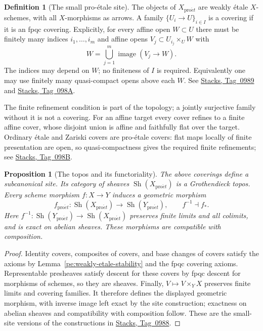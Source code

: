 \documentclass[11pt,a4paper]{article}
\numberwithin{equation}{section}
\newtheorem{proposition}[theorem]{Proposition}
\theoremstyle{definition}
\newtheorem{definition}[theorem]{Definition}
\theoremstyle{remark}
\newcommand{\Sh}{\operatorname{Sh}}
\newcommand{\proet}{\mathrm{pro}\acute{e}t}
\newcommand{\stacks}[1]{\href{https://stacks.math.columbia.edu/tag/#1}{\textnormal{Stacks, Tag~#1}}}
\begin{document}
\begin{definition}[The small pro-\'etale site]
\label{pe:site}
The objects of $X_{\proet}$ are weakly \'etale $X$-schemes, with all
$X$-morphisms as arrows. A family $\{U_i\to U\}_{i\in I}$ is a
covering if it is an fpqc covering. Explicitly, for every affine open
$W\subset U$ there must be finitely many indices
$i_1,\ldots,i_m$ and affine opens
$V_j\subset U_{i_j}\times_UW$ with
\[
 W=\bigcup_{j=1}^m\operatorname{image}(V_j\to W).
\]
The indices may depend on $W$; no finiteness of $I$ is required.
Equivalently one may use finitely many quasi-compact opens above each
$W$. See \stacks{0989} and \stacks{098A}.
\end{definition}

The finite refinement condition is part of the topology; a jointly
surjective family without it is not a covering. For an affine
target every cover refines to a finite affine cover, whose disjoint
union is affine and faithfully flat over the target. Ordinary \'etale
and Zariski covers are pro-\'etale covers: flat maps locally of finite
presentation are open, so quasi-compactness gives the required finite
refinements; see \stacks{098B}.

\begin{proposition}[The topos and its functoriality]
\label{pe:topos-functoriality}
The above coverings define a subcanonical site. Its category of sheaves
$\Sh(X_{\proet})$ is a Grothendieck topos. Every scheme morphism
$f:X\to Y$ induces a geometric morphism
\[
 f_{\proet}:\Sh(X_{\proet})\longrightarrow\Sh(Y_{\proet}),
 \qquad f^{-1}\dashv f_*.
\]
Here $f^{-1}\colon\Sh(Y_{\proet})\to\Sh(X_{\proet})$ preserves finite
limits and all colimits, and is exact on
abelian sheaves. These morphisms are compatible with composition.
\end{proposition}
\begin{proof}
Identity covers, composites of covers, and base changes of covers satisfy
the axioms by Lemma~\ref{pe:weakly-etale-stability} and the fpqc covering
axioms. Representable presheaves satisfy descent for these covers by
fpqc descent for morphisms of schemes, so they are sheaves. Finally,
$V\mapsto V\times_YX$ preserves finite limits and covering families.
It therefore defines the displayed geometric morphism, with inverse
image left exact by the site construction; exactness on abelian sheaves
and compatibility with composition follow. These are the small-site
versions of the constructions in \stacks{0988}.
\end{proof}
\end{document}
